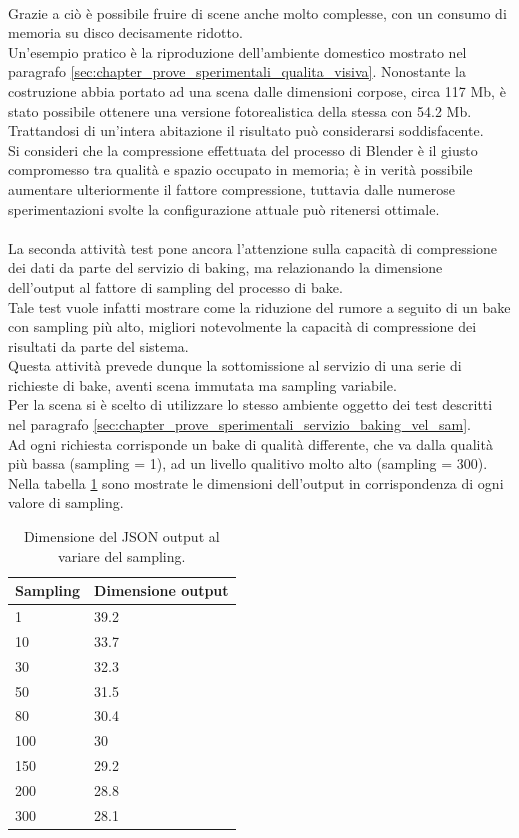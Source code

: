 \\
Grazie a ciò è possibile fruire di scene anche molto complesse, con un consumo di memoria su disco decisamente ridotto. 
\\
Un’esempio pratico è la riproduzione dell’ambiente domestico mostrato nel paragrafo \ref{sec:chapter_prove_sperimentali_qualita_visiva}. Nonostante la costruzione abbia portato ad una scena dalle dimensioni corpose, circa 117 Mb, è stato possibile ottenere una versione fotorealistica della stessa con 54.2 Mb. Trattandosi di un’intera abitazione il risultato può considerarsi soddisfacente.
\\
Si consideri che la compressione effettuata del processo di Blender è il giusto compromesso tra qualità e spazio occupato in memoria; è in verità possibile aumentare ulteriormente il fattore compressione, tuttavia dalle numerose sperimentazioni svolte la configurazione attuale può ritenersi ottimale.
\\
\\
La seconda attività test pone ancora l’attenzione sulla capacità di compressione dei dati da parte del servizio di baking, ma relazionando la dimensione dell’output al fattore di sampling del processo di bake. 
\\
Tale test vuole infatti mostrare come la riduzione del rumore a seguito di un bake con sampling più alto, migliori notevolmente la capacità di compressione dei risultati da parte del sistema.
\\ 
Questa attività prevede dunque la sottomissione al servizio di una serie di richieste di bake, aventi scena immutata ma sampling variabile. 
\\
Per la scena si è scelto di utilizzare lo stesso ambiente oggetto dei test descritti nel paragrafo \ref{sec:chapter_prove_sperimentali_servizio_baking_vel_sam}. 
\\
Ad ogni richiesta corrisponde un bake di qualità differente, che va dalla qualità più bassa (sampling = 1), ad un livello qualitivo molto alto (sampling = 300). Nella tabella \ref{table:dim_sam} sono mostrate le dimensioni dell’output in corrispondenza di ogni valore di sampling.
\\
\begin{table}[h]
\centering
\caption[Dimensioni output variando sampling]{Dimensione del JSON output al variare del sampling.}
\begin{tabular}{|l|l|}
\hline
\textbf{Sampling} & \textbf{Dimensione output} \\ \hline
1 & 39.2 \\ \hline
10 & 33.7 \\ \hline
30 & 32.3 \\ \hline
50 & 31.5 \\ \hline
80 & 30.4 \\ \hline
100 & 30 \\ \hline
150 & 29.2 \\ \hline
200 & 28.8 \\ \hline
300 & 28.1 \\ \hline
\end{tabular}
\label{table:dim_sam}
\end{table}
